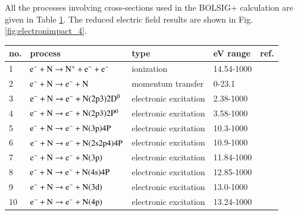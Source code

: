 All the processes involving cross-sections used in the BOLSIG+ calculation are given in Table \ref{tab:tableN}. The reduced electric field results are shown in Fig. \ref{fig:electronimpact_4}.

\begin{table}[!htbp]
  \center{}
  \begin{threeparttable}
    \label{tab:tableN}
    \begin{tabular*}{\textwidth}{l@{\extracolsep{\fill}}llll}
    \toprule
    {no.}  & {process} & {type} &  {eV range}  &  {ref.} \\
    \midrule
      1 & $\rm e^- + N \rightarrow N^+ + e^- + e^-$  &  ionization   &  14.54-1000 &   \cite{lxc:2024:morgan} \\ 
      \midrule     
      2 & $\rm e^- + N \rightarrow e^- + N$  &  momentum transfer   &  0-23.1  & \cite{lxc:2024:morgan}\\   
      \midrule
      3 & $\rm e^- + N \rightarrow e^- + N(2p3)2D^0 $  &  electronic excitation   &  2.38-1000 & \cite{lxc:2024:morgan}\\ 
      4 & $\rm e^- + N \rightarrow e^- + N(2p3)2P^0 $  &  electronic excitation   &  3.58-1000 & \cite{lxc:2024:morgan}\\ 
      5 & $\rm e^- + N \rightarrow e^- + N(3p)4P $  &  electronic excitation   &  10.3-1000 & \cite{lxc:2024:morgan}\\ 
      6 & $\rm e^- + N \rightarrow e^- + N(2s2p4)4P $  &  electronic excitation   &  10.9-1000 & \cite{lxc:2024:morgan}\\ 
      7 & $\rm e^- + N \rightarrow e^- + N(3p) $  &  electronic excitation   &  11.84-1000 & \cite{lxc:2024:morgan}\\ 
      8 & $\rm e^- + N \rightarrow e^- + N(4s)4P $  &  electronic excitation   &  12.85-1000 & \cite{lxc:2024:morgan}\\ 
      9 & $\rm e^- + N \rightarrow e^- + N(3d) $  &  electronic excitation   &  13.0-1000 & \cite{lxc:2024:morgan}\\ 
      10 & $\rm e^- + N \rightarrow e^- + N(4p) $  &  electronic excitation   &  13.24-1000 & \cite{lxc:2024:morgan}\\ 
    \bottomrule
    \end{tabular*}
   \end{threeparttable}
\end{table}

